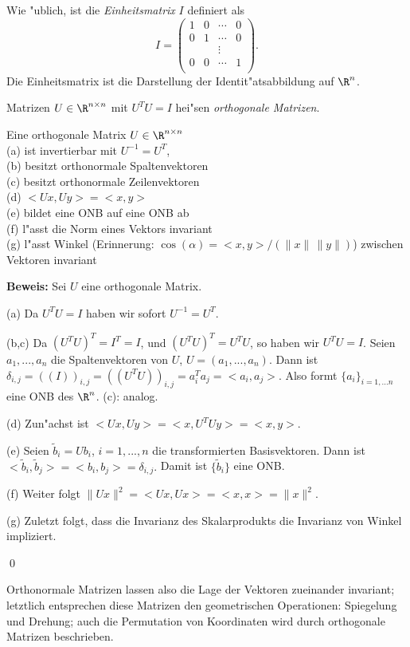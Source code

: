 Wie "ublich, ist die  \emph{Einheitsmatrix} $I$ definiert als 
$$ I = \left(\begin{array}{cccc}
1 & 0& \cdots & 0\\
0 & 1& \cdots & 0\\
               &             & \vdots &                \\
0 & 0 & \cdots & 1\\  
\end{array}\right).
$$
Die Einheitsmatrix ist die Darstellung der Identit"atsabbildung auf $\R^n$.

\begin{sdefi} 
Matrizen $U\in \R^{n\times n}$ mit 
$ U^T U = I$
hei"sen \emph{orthogonale Matrizen}.
\end{sdefi}


\begin{slemma} Eine orthogonale Matrix $U\in\R^{n\times n}$\\
(a) ist invertierbar mit $U^{-1}=U^T$,\\
(b) besitzt orthonormale Spaltenvektoren\\
(c) besitzt orthonormale Zeilenvektoren\\
(d) $<Ux, Uy> = <x,y>$\\
(e) bildet eine ONB auf eine ONB ab\\
(f) l"asst die Norm eines Vektors invariant\\
(g) l"asst Winkel (Erinnerung: $\cos(\alpha) = <x,y>/(\|x\|\,\|y\|)$) zwischen Vektoren invariant\\
\end{slemma}
{\bf Beweis: } Sei $U$ eine orthogonale Matrix. \par 
(a) Da $U^T U = I$ haben wir sofort $U^{-1} = U^T$.\par
(b,c) Da $(U^TU)^T = I^T = I$, und $(U^TU)^T = U^TU$, so haben wir $U^TU=I$. 
Seien $a_1,...,a_n$ die Spaltenvektoren von $U$,  $U=(a_1,...,a_n)$. Dann ist 
$ \delta_{i,j} = ((I))_{i,j} = ((U^TU))_{i,j} = a_i^T a_j = <a_i, a_j>.$
Also formt $\{a_i\}_{i=1,...n}$ eine ONB des $\R^n$. (c): analog.\par
(d) Zun"achst ist $ <Ux,Uy> = <x, U^TUy> = <x,y>$.\par
(e) Seien $\tilde b_i = U b_i$, $i=1,...,n$ die transformierten Basisvektoren. 
Dann ist $ <\tilde b_i, \tilde b_j>  = <b_i, b_j> = \delta_{i,j}.$ Damit ist
 $\{\tilde b_i\}$ eine ONB.\par
(f) Weiter folgt $\|Ux\|^2 = <Ux, Ux> =   <x,x> = \|x\|^2$.\par
(g) Zuletzt folgt, dass die Invarianz des Skalarprodukts die Invarianz von Winkel 
impliziert.
\par\qed
\begin{sbem}
Orthonormale Matrizen lassen also die Lage der Vektoren zueinander invariant; letztlich entsprechen diese Matrizen den geometrischen Operationen: Spiegelung und Drehung; auch die Permutation von Koordinaten wird durch orthogonale Matrizen beschrieben.
\end{sbem}

